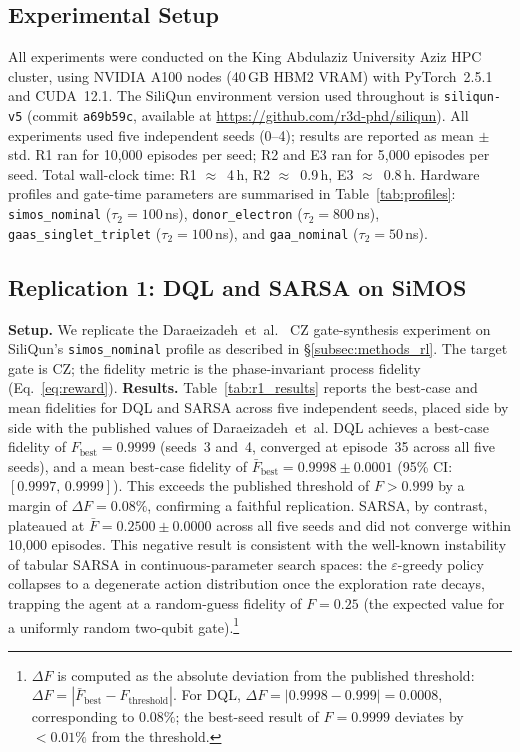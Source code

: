 \subsection{Experimental Setup}
\label{subsec:setup}

All experiments were conducted on the King Abdulaziz University Aziz HPC cluster, using NVIDIA A100 nodes (40\,GB HBM2 VRAM) with PyTorch~2.5.1 and CUDA~12.1. The SiliQun environment version used throughout is \texttt{siliqun-v5} (commit \texttt{a69b59c}, available at \url{https://github.com/r3d-phd/siliqun}). All experiments used five independent seeds (0--4); results are reported as mean $\pm$ std. R1 ran for 10{,}000 episodes per seed; R2 and E3 ran for 5{,}000 episodes per seed. Total wall-clock time: R1 $\approx$~4\,h, R2 $\approx$~0.9\,h, E3 $\approx$~0.8\,h. Hardware profiles and gate-time parameters are summarised in Table~\ref{tab:profiles}: \texttt{simos\_nominal} ($\tau_2 = 100$\,ns), \texttt{donor\_electron} ($\tau_2 = 800$\,ns), \texttt{gaas\_singlet\_triplet} ($\tau_2 = 100$\,ns), and \texttt{gaa\_nominal} ($\tau_2 = 50$\,ns).

\subsection{Replication 1: DQL and SARSA on SiMOS}
\label{subsec:r1_results}

\textbf{Setup.} We replicate the Daraeizadeh~et~al.~\cite{Daraeizadeh2020} CZ gate-synthesis experiment on SiliQun's \texttt{simos\_nominal} profile as described in \S\ref{subsec:methods_rl}. The target gate is CZ; the fidelity metric is the phase-invariant process fidelity (Eq.~\ref{eq:reward}). \textbf{Results.} Table~\ref{tab:r1_results} reports the best-case and mean fidelities for DQL and SARSA across five independent seeds, placed side by side with the published values of Daraeizadeh~et~al. DQL achieves a best-case fidelity of $F_\text{best} = 0.9999$ (seeds~3 and~4, converged at episode~35 across all five seeds), and a mean best-case fidelity of $\bar{F}_\text{best} = 0.9998 \pm 0.0001$ (95\% CI: $[0.9997,\,0.9999]$). This exceeds the published threshold of $F > 0.999$ by a margin of $\Delta F = 0.08\%$, confirming a faithful replication. SARSA, by contrast, plateaued at $\bar{F} = 0.2500 \pm 0.0000$ across all five seeds and did not converge within 10{,}000 episodes. This negative result is consistent with the well-known instability of tabular SARSA in continuous-parameter search spaces: the $\varepsilon$-greedy policy collapses to a degenerate action distribution once the exploration rate decays, trapping the agent at a random-guess fidelity of $F = 0.25$ (the expected value for a uniformly random two-qubit gate).\footnote{$\Delta F$ is computed as the absolute deviation from the published threshold: $\Delta F = |\bar{F}_{\text{best}} - F_{\text{threshold}}|$. For DQL, $\Delta F = |0.9998 - 0.999| = 0.0008$, corresponding to $0.08\%$; the best-seed result of $F = 0.9999$ deviates by $< 0.01\%$ from the threshold.}


